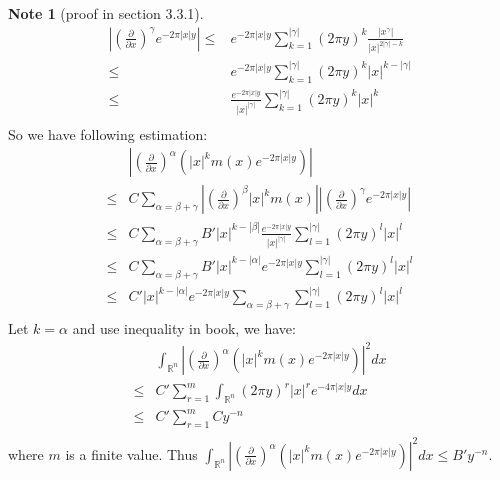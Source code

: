 \documentclass{report}
\theoremstyle{definition}
\newtheorem{note}{Note}
\theoremstyle{definition}
\theoremstyle{plain}
\numberwithin{theorem}{section}
\numberwithin{remark}{section}
\numberwithin{equation}{section}
\newcommand{\abs}[1]{\left\lvert#1\right\rvert}
\begin{document}
\begin{note}[proof in section 3.3.1]
    \begin{align*}
        \abs{(\frac{\partial}{\partial x})^\gamma e^{-2\pi\abs{x}y}}\leq&e^{-2\pi\abs{x}y}\sum_{k=1}^{\abs{\gamma}}(2\pi y)^k\frac{\abs{x^\gamma}}{\abs{x}^{2\abs{\gamma}-k}}\\
        \leq&e^{-2\pi\abs{x}y}\sum_{k=1}^{\abs{\gamma}}(2\pi y)^k\abs{x}^{k-\abs{\gamma}}\\
        \leq&\frac{e^{-2\pi\abs{x}y}}{\abs{x}^{\abs{\gamma}}}\sum_{k=1}^{\abs{\gamma}}(2\pi y)^k\abs{x}^{k}\\
    \end{align*} 
    So we have following estimation:
    \begin{align*}
        &\abs{(\frac{\partial}{\partial x})^\alpha (\abs{x}^km(x)e^{-2\pi\abs{x}y})}\\
        \leq & C\sum_{\alpha=\beta+\gamma}\abs{(\frac{\partial}{\partial x})^\beta\abs{x}^km(x)}\abs{(\frac{\partial}{\partial x})^\gamma e^{-2\pi\abs{x}y}}\\
        \leq & C\sum_{\alpha=\beta+\gamma}B'\abs{x}^{k-\abs{\beta}}\frac{e^{-2\pi\abs{x}y}}{\abs{x}^{\abs{\gamma}}}\sum_{l=1}^{\abs{\gamma}}(2\pi y)^l\abs{x}^{l}\\
        \leq & C\sum_{\alpha=\beta+\gamma}B'\abs{x}^{k-\abs{\alpha}}{e^{-2\pi\abs{x}y}}\sum_{l=1}^{\abs{\gamma}}(2\pi y)^l\abs{x}^{l}\\
        \leq & C'\abs{x}^{k-\abs{\alpha}}{e^{-2\pi\abs{x}y}}\sum_{\alpha=\beta+\gamma}\sum_{l=1}^{\abs{\gamma}}(2\pi y)^l\abs{x}^{l}\\
    \end{align*}
Let $k=\alpha$ and use inequality in book, we have:
\begin{align*}
    &\int_{\mathbb{R}^n}\abs{(\frac{\partial}{\partial x})^\alpha (\abs{x}^km(x)e^{-2\pi\abs{x}y})}^2 dx\\
    \leq & C'\sum_{r=1}^{m}\int_{\mathbb{R}^n}(2\pi y)^r\abs{x}^{r}e^{-4\pi\abs{x}y}dx\\
    \leq & C'\sum_{r=1}^{m}Cy^{-n}\\
\end{align*}
where $m$ is a finite value. Thus $\int_{\mathbb{R}^n}\abs{(\frac{\partial}{\partial x})^\alpha (\abs{x}^km(x)e^{-2\pi\abs{x}y})}^2 dx\leq B'y^{-n}$.
\end{note}
\end{document}

